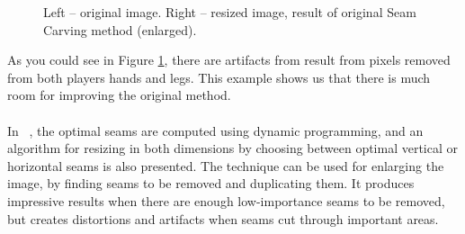 \documentclass[conference]{acmsiggraph}
\begin{document}
\begin{figure}[ht]       
    \caption{Left -- original image. Right -- resized image, result of original Seam Carving method (enlarged). }
    \label{fig:orgSeamCarving}
\end{figure}


 As you could see in Figure \ref{fig:orgSeamCarving}, there are artifacts from result from pixels removed from both players hands and legs. This example shows us that there is much room for improving the original method.

\paragraph{}
In  ~\cite{Avidan2007}, the optimal seams are computed using dynamic programming, and an algorithm for resizing in both dimensions by choosing between optimal vertical or horizontal seams is also presented. The technique can be used for enlarging the image, by finding seams to be removed and duplicating them. It produces impressive results when there are enough low-importance seams to be removed, but creates distortions and artifacts when seams cut through important areas.
\end{document}
